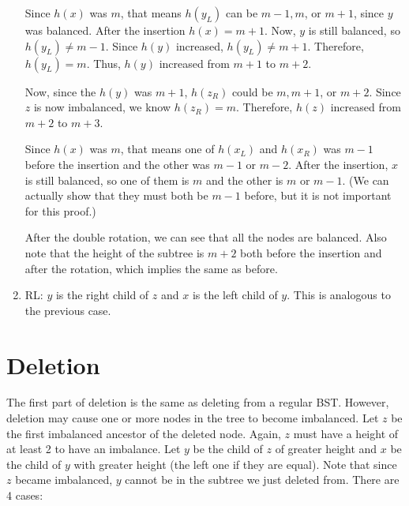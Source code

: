 \documentclass[12pt]{article}
\begin{document}
\begin{enumerate}
  Since $h(x)$ was $m$, that means $h(y_L)$ can be $m-1, m$, or $m+1$, since $y$ was balanced. After the insertion $h(x) = m+1$. Now, $y$ is still balanced, so $h(y_L) \neq m-1$. Since $h(y)$ increased, $h(y_L) \neq m+1$. Therefore, $h(y_L) = m$. Thus, $h(y)$ increased from $m+1$ to $m+2$.

  Now, since the $h(y)$ was $m+1$, $h(z_R)$ could be $m, m+1$, or $m+2$. Since $z$ is now imbalanced, we know $h(z_R) = m$. Therefore, $h(z)$ increased from $m+2$ to $m+3$.

  Since $h(x)$ was $m$, that means one of $h(x_L)$ and $h(x_R)$ was $m-1$ before the insertion and the other was $m-1$ or $m-2$. After the insertion, $x$ is still balanced, so one of them is $m$ and the other is $m$ or $m-1$. (We can actually show that they must both be $m-1$ before, but it is not important for this proof.)

  After the double rotation, we can see that all the nodes are balanced. Also note that the height of the subtree is $m+2$ both before the insertion and after the rotation, which implies the same as before.

  \item RL: $y$ is the right child of $z$ and $x$ is the left child of $y$. This is analogous to the previous case.

\end{enumerate}

\section*{Deletion}
The first part of deletion is the same as deleting from a regular BST. However, deletion may cause one or more nodes in the tree to become imbalanced. Let $z$ be the first imbalanced ancestor of the deleted node. Again, $z$ must have a height of at least 2 to have an imbalance. Let $y$ be the child of $z$ of greater height and $x$ be the child of $y$ with greater height (the left one if they are equal). Note that since $z$ became imbalanced, $y$ cannot be in the subtree we just deleted from. There are 4 cases:
\end{document}
